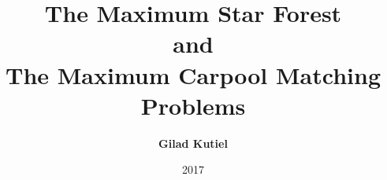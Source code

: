\title{
The Maximum Star Forest 
\\
and 
\\
The Maximum Carpool Matching
\\
Problems 
}
\author[shortname]{
    \textbf{Gilad Kutiel}
}
\date{2017}

